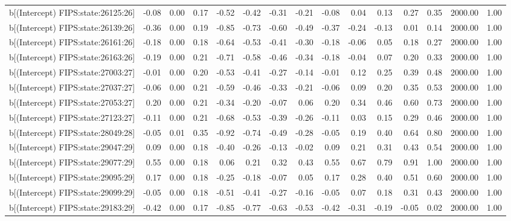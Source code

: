 \begin{table}[ht]
\begin{tabular}{rrrrrrrrrrrrrrr}
  b[(Intercept) FIPS:state:26125:26] & -0.08 & 0.00 & 0.17 & -0.52 & -0.42 & -0.31 & -0.21 & -0.08 & 0.04 & 0.13 & 0.27 & 0.35 & 2000.00 & 1.00 \\ 
  b[(Intercept) FIPS:state:26139:26] & -0.36 & 0.00 & 0.19 & -0.85 & -0.73 & -0.60 & -0.49 & -0.37 & -0.24 & -0.13 & 0.01 & 0.14 & 2000.00 & 1.00 \\ 
  b[(Intercept) FIPS:state:26161:26] & -0.18 & 0.00 & 0.18 & -0.64 & -0.53 & -0.41 & -0.30 & -0.18 & -0.06 & 0.05 & 0.18 & 0.27 & 2000.00 & 1.00 \\ 
  b[(Intercept) FIPS:state:26163:26] & -0.19 & 0.00 & 0.21 & -0.71 & -0.58 & -0.46 & -0.34 & -0.18 & -0.04 & 0.07 & 0.20 & 0.33 & 2000.00 & 1.00 \\ 
  b[(Intercept) FIPS:state:27003:27] & -0.01 & 0.00 & 0.20 & -0.53 & -0.41 & -0.27 & -0.14 & -0.01 & 0.12 & 0.25 & 0.39 & 0.48 & 2000.00 & 1.00 \\ 
  b[(Intercept) FIPS:state:27037:27] & -0.06 & 0.00 & 0.21 & -0.59 & -0.46 & -0.33 & -0.21 & -0.06 & 0.09 & 0.20 & 0.35 & 0.53 & 2000.00 & 1.00 \\ 
  b[(Intercept) FIPS:state:27053:27] & 0.20 & 0.00 & 0.21 & -0.34 & -0.20 & -0.07 & 0.06 & 0.20 & 0.34 & 0.46 & 0.60 & 0.73 & 2000.00 & 1.00 \\ 
  b[(Intercept) FIPS:state:27123:27] & -0.11 & 0.00 & 0.21 & -0.68 & -0.53 & -0.39 & -0.26 & -0.11 & 0.03 & 0.15 & 0.29 & 0.46 & 2000.00 & 1.00 \\ 
  b[(Intercept) FIPS:state:28049:28] & -0.05 & 0.01 & 0.35 & -0.92 & -0.74 & -0.49 & -0.28 & -0.05 & 0.19 & 0.40 & 0.64 & 0.80 & 2000.00 & 1.00 \\ 
  b[(Intercept) FIPS:state:29047:29] & 0.09 & 0.00 & 0.18 & -0.40 & -0.26 & -0.13 & -0.02 & 0.09 & 0.21 & 0.31 & 0.43 & 0.54 & 2000.00 & 1.00 \\ 
  b[(Intercept) FIPS:state:29077:29] & 0.55 & 0.00 & 0.18 & 0.06 & 0.21 & 0.32 & 0.43 & 0.55 & 0.67 & 0.79 & 0.91 & 1.00 & 2000.00 & 1.00 \\ 
  b[(Intercept) FIPS:state:29095:29] & 0.17 & 0.00 & 0.18 & -0.25 & -0.18 & -0.07 & 0.05 & 0.17 & 0.28 & 0.40 & 0.51 & 0.60 & 2000.00 & 1.00 \\ 
  b[(Intercept) FIPS:state:29099:29] & -0.05 & 0.00 & 0.18 & -0.51 & -0.41 & -0.27 & -0.16 & -0.05 & 0.07 & 0.18 & 0.31 & 0.43 & 2000.00 & 1.00 \\ 
  b[(Intercept) FIPS:state:29183:29] & -0.42 & 0.00 & 0.17 & -0.85 & -0.77 & -0.63 & -0.53 & -0.42 & -0.31 & -0.19 & -0.05 & 0.02 & 2000.00 & 1.00 \\ 

\end{tabular}
\end{table}
